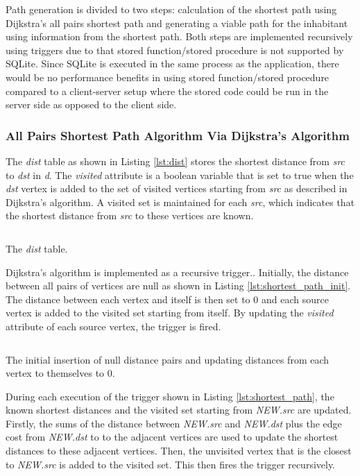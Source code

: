 \documentclass{article}
\begin{document}
Path generation is divided to two steps: calculation of the shortest path using Dijkstra's all pairs shortest path and generating a viable path for the inhabitant using information from the shortest path. Both steps are implemented recursively using triggers due to that stored function/stored procedure is not supported by SQLite. Since SQLite is executed in the same process as the application, there would be no performance benefits in using stored function/stored procedure compared to a client-server setup where the stored code could be run in the server side as opposed to the client side.

\subsubsection{All Pairs Shortest Path Algorithm Via Dijkstra's Algorithm}
The \textit{dist} table as shown in Listing \ref{lst:dist} stores the shortest distance from \textit{src} to \textit{dst} in \textit{d}. The \textit{visited} attribute is a boolean variable that is set to true when the \textit{dst} vertex is added to the set of visited vertices starting from \textit{src} as described in Dijkstra's algorithm.\cite{dijkstra_wikipedia} A visited set is maintained for each \textit{src}, which indicates that the shortest distance from \textit{src} to these vertices are known.

\begin{listing}[H]
    \inputminted[firstline=24, lastline=30, breaklines=true]
    {sql}{shortest_path.sql}
    \caption{The \textit{dist} table.}
    \label{lst:dist}
\end{listing}

Dijkstra's algorithm is implemented as a recursive trigger.\cite{sqlite_forum}. Initially, the distance between all pairs of vertices are null as shown in Listing \ref{lst:shortest_path_init}. The distance between each vertex and itself is then set to 0 and each source vertex is added to the visited set starting from itself. By updating the \textit{visited} attribute of each source vertex, the trigger is fired.

\begin{listing}[H]
    \inputminted[firstline=52, lastline=60, breaklines=true]
    {sql}{shortest_path.sql}
    \caption{The initial insertion of null distance pairs and updating distances from each vertex to themselves to 0.}
    \label{lst:shortest_path_init}
\end{listing}

During each execution of the trigger shown in Listing \ref{lst:shortest_path}, the known shortest distances and the visited set starting from \textit{NEW.src} are updated. Firstly, the sums of the distance between \textit{NEW.src} and \textit{NEW.dst} plus the edge cost from \textit{NEW.dst} to to the adjacent vertices are used to update the shortest distances to these adjacent vertices. Then, the unvisited vertex that is the closest to \textit{NEW.src} is added to the visited set. This then fires the trigger recursively.
\end{document}
